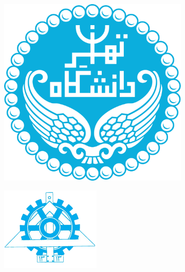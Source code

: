 \documentclass[12pt]{article}
\begin{document}
\begin{figure}[!tbp]
  \begin{subfigure}[b]{0.2 \textwidth}
    \includegraphics[width=\textwidth]{img/uni}
  \end{subfigure}
  \hfill
  \begin{subfigure}[b]{0.25\textwidth}
    \includegraphics[width=\textwidth]{img/fani}
  \end{subfigure}
\end{figure}
\end{document}
